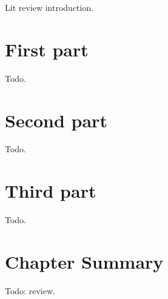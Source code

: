 Lit review introduction.

\section{First part}

Todo.

\section{Second part}

Todo.

\section{Third part}

Todo.


\section{Chapter Summary}

Todo: review.
